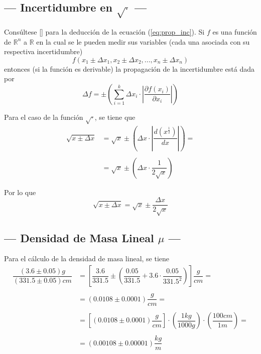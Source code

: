 \documentclass[a4paper, 10pt]{article}
\begin{document}
	\subsection{--- Incertidumbre en $ \sqrt{\cdot} $ ---}
	
	Consúltese [] para la deducción de la ecuación (\ref{eq:prop_inc}). Si $f$ es una función de $\mathbb{R}^n$ a $\mathbb{R}$ en la cual se le pueden medir sus variables (cada una asociada con su respectiva incertidumbre)
	$$f(x_1\pm\Delta x_1,x_2\pm\Delta x_2,...,x_n\pm\Delta x_n)$$
	entonces (si la función es derivable) la propagación de la incertidumbre está dada por
	\begin{equation}
		\Delta f=\pm\left(\displaystyle\sum_{i=1}^k\Delta x_i\cdot\left|\dfrac{\partial f(x_i)}{\partial x_i}\right| \right)
		\label{eq:prop_inc}
	\end{equation} 
	
	Para el caso de la función $ \sqrt{\cdot} $, se tiene que 
	\begin{align*}
		\sqrt{x\pm\Delta x}&=
		\sqrt{x}\pm\left(\Delta x\cdot\left|\dfrac{d(x^{\frac{1}{2}})}{dx}\right|\right)=\\\\
		&=\sqrt{x}\pm\left(\Delta x\cdot\dfrac{1}{2\sqrt{x}}\right)
	\end{align*} 
	
	Por lo que
	\begin{equation}
		\sqrt{x\pm\Delta x}=\sqrt{x}\pm\dfrac{\Delta x}{2\sqrt{x}}
		\label{rc}
	\end{equation}
	
	\subsection{--- Densidad de Masa Lineal $ \mu $ ---}
	
	Para el cálculo de la densidad de masa lineal, se tiene
	\begin{align*}
		\dfrac{(3.6 \pm 0.05)g}{(331.5\pm 0.05) cm }&=\left[\dfrac{3.6}{331.5}\pm \left(\dfrac{0.05}{331.5}+3.6\cdot \dfrac{0.05}{331.5^2}\right)\right]\dfrac{g}{cm}=\\\\
		&=\left(0.0108\pm0.0001\right)\dfrac{g}{cm}=\\\\
		&=\left[\left(0.0108\pm0.0001\right)\dfrac{g}{cm}\right]\cdot
		\left(\dfrac{1kg}{1000 g}\right)\cdot\left(\dfrac{100 cm}{1 m}\right)=\\\\
		&=(0.00108\pm 0.00001)\dfrac{kg}{m}
	\end{align*}
	
\end{document}
